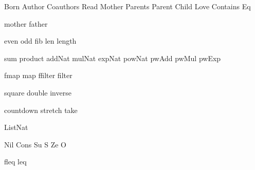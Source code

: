 
\DefRel Born
\DefRel Author
\DefRel Coauthors
\DefRel Read
\DefRel Mother
\DefRel Parents
\DefRel Parent
\DefRel Child
\DefRel Love
\DefRel Contains
\DefRel Eq

\DefFun mother
\DefFun father

\DefFun even
\DefFun odd
\DefFun fib
\DefFun len
\DefFun length

\DefFun sum
\DefFun product
\DefFun addNat
\DefFun mulNat
\DefFun expNat
\DefFun powNat
\DefFun pwAdd
\DefFun pwMul
\DefFun pwExp

\DefFUN fmap map
\DefFUN ffilter filter

\DefFun square
\DefFun double
\DefFun inverse

\DefFpf countdown
\DefFpf stretch
\DefFpf take

\DefType ListNat

\DefCons Nil
\DefCons Cons
\DefCONS Su S
\DefCONS Ze O

\DefFUN fleq leq

\def\bla{\mathrm{bla}}
\def\blu{\mathrm{blu}}

\def\persons{{\cal P}}
\let\pers=\persons

\def\euclid{\algorithmstylize{Euclid}}%

\def\Smile{\rel{\woohoo}}
\def\Frown{\rel{\boohoo}}

\def\oddAs#1{A_{[#1]}}

